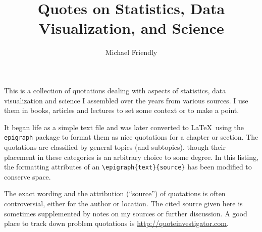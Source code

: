 \documentclass[11pt]{article}
\title{Quotes on Statistics, Data Visualization, and Science}
\author{Michael Friendly}
\begin{document}
\maketitle

This is a collection of quotations dealing with aspects of statistics, data visualization
and science I assembled over the years from various
sources.  I use them in books, articles and lectures to set some context
or to make a point.
 
It began life as a simple text file and was later converted to
\LaTeX\  using the \texttt{epigraph} package to format them as nice
quotations for a chapter or section.  
The quotations are classified by general topics (and subtopics), though their placement
in these categories is an arbitrary choice to some degree.
In this listing, the formatting attributes of an \verb|\epigraph{text}{source}|
has been modified to conserve space.

The exact wording and the attribution (``source'') of quotations is often controversial, either for
the author or location.
The cited source given here is sometimes
supplemented by notes on my sources or further discussion.
A good place to track down problem quotations is \url{http://quoteinvestigator.com}.





\end{document}
